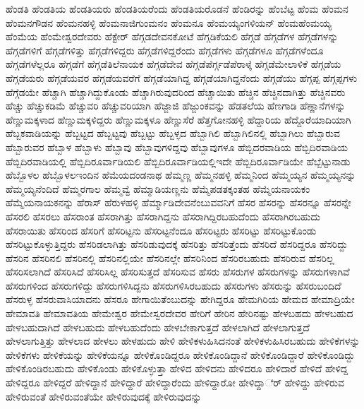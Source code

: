 {ಹೆಂಡತಿ
ಹೆಂಡತಿಯ
ಹೆಂಡತಿಯರು
ಹೆಂಡತಿಯರೆಂದು
ಹೆಂಡತಿಯರೊಡನೆ
ಹೆಂಡಿರನ್ನು
ಹೆಂಬೆಟ್ಟ
ಹೆಂಮ
ಹೆಂಮನ
ಹೆಂಮನಗೌಡನ
ಹೆಂಮನಹಳ್ಳಿ
ಹೆಂಮನಾಜಿಗುಂಮನಂ
ಹೆಂಮನೂ
ಹೆಂಮಯ್ಯಂಗಳಿಯನ್
ಹೆಂಮಹೆಂಮಯ್ಯ
ಹೆಂಮೆಯ
ಹೆಂಮೇಶ್ವರದೇವರು
ಹೆಕ್ಟೇರ್
ಹೆಗ್ಗಡದೇವನಕೋಟೆ
ಹೆಗ್ಗಡಿಕೆಯಲಿ
ಹೆಗ್ಗಡೆ
ಹೆಗ್ಗಡೆಗಳ
ಹೆಗ್ಗಡೆಗಳನ್ನು
ಹೆಗ್ಗಡೆಗಳಿಗೆ
ಹೆಗ್ಗಡೆಗಳಿತ್ತು
ಹೆಗ್ಗಡೆಗಳಿದ್ದರು
ಹೆಗ್ಗಡೆಗಳಿದ್ದರೆಂದು
ಹೆಗ್ಗಡೆಗಳು
ಹೆಗ್ಗಡೆಗಳೂ
ಹೆಗ್ಗಡೆಗಳೆಂದೂ
ಹೆಗ್ಗಡೆಗಳೆಲ್ಲರೂ
ಹೆಗ್ಗಡೆಗೆ
ಹೆಗ್ಗಡೆತಿಲೆನಾಯಕ
ಹೆಗ್ಗಡೆದೇವ
ಹೆಗ್ಗಡೆಪೆರ್ಗ್ಗಡೆಪೆರಾಳ್ಕೆ
ಹೆಗ್ಗಡೆಮೇಲಾಳಿಕೆ
ಹೆಗ್ಗಡೆಯ
ಹೆಗ್ಗಡೆಯರು
ಹೆಗ್ಗಡೆಯವರ
ಹೆಗ್ಗಡೆಯವರೆಗೆ
ಹೆಗ್ಗಡೆಯಾಗಿದ್ದ
ಹೆಗ್ಗಡೆಯಾಗಿದ್ದನೆಂದು
ಹೆಗ್ಗಡೆಯು
ಹೆಗ್ಗಪ್ಪ
ಹೆಗ್ಗಪ್ಪಗಳು
ಹೆಗ್ಗೆಡಯೇ
ಹೆಚ್ಚಾಗಿ
ಹೆಚ್ಚಾಗಿದ್ದುಕೊಂಡು
ಹೆಚ್ಚಾಗಿರುವುದರಿಂದ
ಹೆಚ್ಚಾಯಿತು
ಹೆಚ್ಚಿನ
ಹೆಚ್ಚಿನದಾಗಿತ್ತು
ಹೆಚ್ಚಿನವರು
ಹೆಚ್ಚು
ಹೆಚ್ಚುಕಡಿಮೆ
ಹೆಚ್ಚುವರಿ
ಹೆಚ್ಚುವರಿಯಾಗಿ
ಹೆಜ್ಜಾಜಿ
ಹೆಜ್ಜುಂಕವನ್ನು
ಹೆಡತಲೆಯ
ಹೆಣಗಾಡಿ
ಹೆಣ್ಣಾನೆಗಳನ್ನು
ಹೆಣ್ಣುಮಕ್ಕಳಾದ
ಹೆಣ್ಣುಮಕ್ಕಳಿದ್ದರು
ಹೆಣ್ಣುಮಕ್ಕಳೂ
ಹೆಣ್ಣುಸೆರೆ
ಹೆತ್ತಗೋನಹಳ್ಳಿ
ಹೆದ್ದಾರಿಯ
ಹೆದ್ದೊರೆಯಾದಿಯಾಗಿ
ಹೆಬ್ಬಕವಾಡಿಯನ್ನು
ಹೆಬ್ಬಟ್ಟದ
ಹೆಬ್ಬಟ್ಟವು
ಹೆಬ್ಬಟ್ಟು
ಹೆಬ್ಬಳ್ಳದ
ಹೆಬ್ಬಾಗಿಲಿ
ಹೆಬ್ಬಾಗಿಲಿನಲ್ಲಿ
ಹೆಬ್ಬಾಗಿಲು
ಹೆಬ್ಬಾರುವ
ಹೆಬ್ಬಾರುವರ
ಹೆಬ್ಬಾಳ
ಹೆಬ್ಬಾಳು
ಹೆಬ್ಬಾವು
ಹೆಬ್ಬಾವುಗಳಿದ್ದವು
ಹೆಬ್ಬಾವುಗಳೂ
ಹೆಬ್ಬಿದರವಾಡಿಯ
ಹೆಬ್ಬಿದಿರವಾಡಿಯ
ಹೆಬ್ಬಿದಿರವಾಡಿಯಲ್ಲಿ
ಹೆಬ್ಬಿದಿರೂರ್ವಾಡಿಯಲಿ
ಹೆಬ್ಬಿದಿರೂರ್ವಾಡಿಯಲ್ಲಿಇದೇ
ಹೆಬ್ಬಿದಿರೂರ್ವಾಡಿಯೇ
ಹೆಬ್ಬೆಟ್ಟುನಾಡು
ಹೆಬ್ಬೊಳಲ
ಹೆಬ್ಬೊಳಲಇಂದಿನ
ಹೆಮೆಯದಂಡನಾಥ
ಹೆಮ್ಮಣ್ಣ
ಹೆಮ್ಮನಹಳ್ಳಿ
ಹೆಮ್ಮನಿಂದ
ಹೆಮ್ಮಯ್ಯನ
ಹೆಮ್ಮಯ್ಯನನ್ನು
ಹೆಮ್ಮಯ್ಯನೆಂದಿದೆ
ಹೆಮ್ಮರಗಾಲ
ಹೆಮ್ಮವ್ವೆ
ಹೆಮ್ಮಾಡಿಯಣ್ಣನು
ಹೆಮ್ಮೆಪಡತಕ್ಕಂತಹ
ಹೆಮ್ಮೆಯನಾಯಕಂ
ಹೆಮ್ಮೆಯನಾಯಕನನ್ನು
ಹೆರಾಸ್
ಹೆರುಳಹಳ್ಳಿ
ಹೆರ್ಮ್ಮಾಡಿದೇವನೆಂಬುವವನಿಗೆ
ಹೆಸರ
ಹೆಸರನ್ನು
ಹೆಸರನ್ನೂ
ಹೆಸರನ್ನೇ
ಹೆಸರಲಿ
ಹೆಸರಲು
ಹೆಸರಾಂತ
ಹೆಸರಾಗಿತ್ತು
ಹೆಸರಾಗಿದ್ದನು
ಹೆಸರಾಗಿದ್ದಿರಬಹುದೆಂದು
ಹೆಸರಾಗಿರಬಹುದು
ಹೆಸರಾಯಿತು
ಹೆಸರಿಂದ
ಹೆಸರಿಗೆ
ಹೆಸರಿಟ್ಟನು
ಹೆಸರಿಟ್ಟನೆಂದೂ
ಹೆಸರಿಟ್ಟರು
ಹೆಸರಿಟ್ಟು
ಹೆಸರಿಟ್ಟುಕೊಂಡು
ಹೆಸರಿಟ್ಟುಕೊಳ್ಳುತ್ತಿದ್ದರು
ಹೆಸರಿಡಲಾಗಿತ್ತು
ಹೆಸರಿಡುವುದಕ್ಕೆ
ಹೆಸರಿತ್ತು
ಹೆಸರಿತ್ತೆಂದು
ಹೆಸರಿದೆ
ಹೆಸರಿದ್ದರೂ
ಹೆಸರಿದ್ದು
ಹೆಸರಿನ
ಹೆಸರಿನಲಿ
ಹೆಸರಿನಲ್ಲಿ
ಹೆಸರಿನಲ್ಲಿಯೇ
ಹೆಸರಿನಲ್ಲೇ
ಹೆಸರಿನಿಂದ
ಹೆಸರಿರಬಹುದು
ಹೆಸರಿರುವ
ಹೆಸರಿಲ್ಲ
ಹೆಸರಿಸಲಾಗಿದೆ
ಹೆಸರಿಸಿದೆ
ಹೆಸರಿಸಿಲ್ಲ
ಹೆಸರಿಸುತ್ತದೆ
ಹೆಸರಿಸುವ
ಹೆಸರು
ಹೆಸರುಗಳ
ಹೆಸರುಗಳನ್ನು
ಹೆಸರುಗಳಾಗಿವೆ
ಹೆಸರುಗಳಿಂದ
ಹೆಸರುಗಳಿದ್ದು
ಹೆಸರುಗಳಿಸಿದ್ದನು
ಹೆಸರುಗಳಿಸಿರಬಹುದು
ಹೆಸರುಗಳು
ಹೆಸರುನ್ನು
ಹೆಸರುಬಂದಿದೆ
ಹೆಸರುಳ್ಳ
ಹೆಸರುವಾಸಿಯಾದನು
ಹೆಸರೂ
ಹೇಗಾಯಿತೆಂಬುದನ್ನು
ಹೇಗಿದ್ದರೂ
ಹೇಮಗಿರಿಯ
ಹೇಮದ
ಹೇಮಾದ್ರಿಯೇ
ಹೇಮಾವತಿ
ಹೇಮಾವತಿಯ
ಹೇಮೇಶ್ವರ
ಹೇಮೇಸ್ವರದೇವರ
ಹೇರಿಗೆ
ಹೇರಿನ
ಹೇರಿನಷ್ಟು
ಹೇಳಬಹದು
ಹೇಳಬಹುದ
ಹೇಳಬಹುದಾಗಿದೆ
ಹೇಳಬಹುದು
ಹೇಳಬಹುದೆಂದು
ಹೇಳಬೇಕಾಗುತ್ತದೆ
ಹೇಳಲಾಗಿದೆ
ಹೇಳಲಾಗುತ್ತದೆ
ಹೇಳಲಾಗುತ್ತಿತ್ತು
ಹೇಳಲಾದ
ಹೇಳಲು
ಹೇಳಹುದು
ಹೇಳಿ
ಹೇಳಿಕಳುಹಿಸಿದನಂತೆ
ಹೇಳಿಕಳುಹಿಸಿರಬಹುದು
ಹೇಳಿಕೆಗಳನ್ನು
ಹೇಳಿಕೆಗಳು
ಹೇಳಿಕೆಯನ್ನು
ಹೇಳಿಕೆಯನ್ನೂ
ಹೇಳಿಕೊಂಡಿದ್ದರೂ
ಹೇಳಿಕೊಂಡಿದ್ದಾನೆ
ಹೇಳಿಕೊಂಡಿದ್ದಾರೆ
ಹೇಳಿಕೊಂಡಿದ್ದು
ಹೇಳಿಕೊಂಡಿರಬಹುದು
ಹೇಳಿಕೊಂಡು
ಹೇಳಿಕೊಳ್ಳುತ್ತಾ
ಹೇಳಿದ
ಹೇಳಿದನು
ಹೇಳಿದರೂ
ಹೇಳಿದಾರೆ
ಹೇಳಿದೆ
ಹೇಳಿದ್ದ
ಹೇಳಿದ್ದರೂ
ಹೇಳಿದ್ದರೆ
ಹೇಳಿದ್ದಾನೆ
ಹೇಳಿದ್ದಾರೆ
ಹೇಳಿದ್ದಾರೆಂದು
ಹೇಳಿದ್ದಾರೋ
ಹೇಳಿದ್ದಾರ್ೆ
ಹೇಳಿದ್ದು
ಹೇಳಿರುವ
ಹೇಳಿರುವಂತೆ
ಹೇಳಿರುವಂತೆಯೇ
ಹೇಳಿರುವುದಕ್ಕೆ
ಹೇಳಿರುವುದನ್ನು
}
